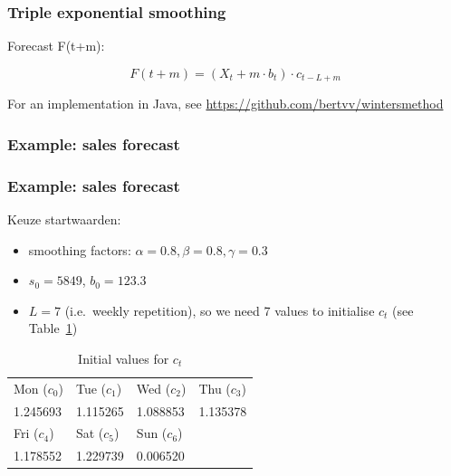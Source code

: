 \documentclass{beamer}
\begin{document}
\begin{frame}
  \frametitle{Triple exponential smoothing}

  Forecast F(t+m):

  \[ F(t+m) = (X_{t} + m \cdot b_{t}) \cdot c_{t-L+m} \]

  For an implementation in Java, see \url{https://github.com/bertvv/wintersmethod}
\end{frame}

\begin{frame}
  \frametitle{Example: sales forecast}

  \centering
\end{frame}

\begin{frame}
  \frametitle{Example: sales forecast}

  Keuze startwaarden:

  \begin{itemize}
    \item smoothing factors: $\alpha = 0.8, \beta = 0.8, \gamma = 0.3$
    \item $s_0 = 5849$, $b_0 = 123.3$
    \item $L = 7$ (i.e.~weekly repetition), so we need 7 values to initialise $c_t$ (see Table~\ref{tab:winters-init-c})
  \end{itemize}

  \begin{table}
    \centering
    \begin{tabular}{l|l|l|l}
      Mon ($c_0$) & Tue ($c_1$) & Wed ($c_2$) & Thu ($c_3$)  \\
      1.245693 & 1.115265 & 1.088853 & 1.135378 \\
      \hline \hline
      Fri ($c_4$)  & Sat ($c_5$)  & Sun ($c_6$)  & \\
      1.178552 & 1.229739 & 0.006520 &
    \end{tabular}
    \caption{Initial values for $c_t$}
    \label{tab:winters-init-c}
  \end{table}
\end{frame}
\end{document}
